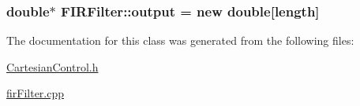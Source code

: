 \subsubsection[{\texorpdfstring{output}{output}}]{\setlength{\rightskip}{0pt plus 5cm}double$\ast$ F\+I\+R\+Filter\+::output = new double\mbox{[}{\bf length}\mbox{]}}\hypertarget{classFIRFilter_a0a616fd678a499167f252253b2300c76}{}\label{classFIRFilter_a0a616fd678a499167f252253b2300c76}


The documentation for this class was generated from the following files\+:\begin{DoxyCompactItemize}
\item 
\hyperlink{CartesianControl_8h}{Cartesian\+Control.\+h}\item 
\hyperlink{firFilter_8cpp}{fir\+Filter.\+cpp}\end{DoxyCompactItemize}
